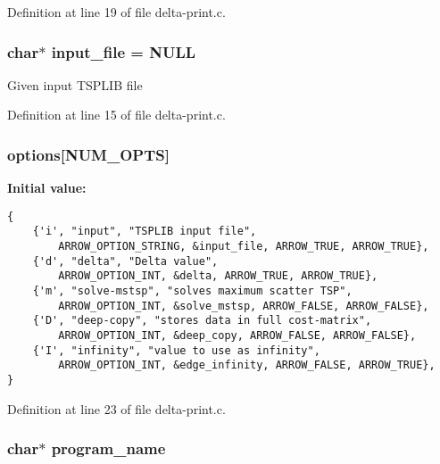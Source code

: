 Definition at line 19 of file delta-print.c.\hypertarget{delta-print_8c_a4f3a15de34c409bdec6ceacf93078ed}{
\subsubsection[{input\_\-file}]{\setlength{\rightskip}{0pt plus 5cm}char$\ast$ {\bf input\_\-file} = NULL}}
\label{delta-print_8c_a4f3a15de34c409bdec6ceacf93078ed}


Given input TSPLIB file 

Definition at line 15 of file delta-print.c.\hypertarget{delta-print_8c_cea6a9709d519c143f30db401a0d0c72}{
\subsubsection[{options}]{ {\bf options}\mbox{[}NUM\_\-OPTS\mbox{]}}}
\label{delta-print_8c_cea6a9709d519c143f30db401a0d0c72}


\textbf{Initial value:}

\begin{Code}\begin{verbatim} 
{
    {'i', "input", "TSPLIB input file", 
        ARROW_OPTION_STRING, &input_file, ARROW_TRUE, ARROW_TRUE},
    {'d', "delta", "Delta value", 
        ARROW_OPTION_INT, &delta, ARROW_TRUE, ARROW_TRUE},
    {'m', "solve-mstsp", "solves maximum scatter TSP",
        ARROW_OPTION_INT, &solve_mstsp, ARROW_FALSE, ARROW_FALSE},
    {'D', "deep-copy", "stores data in full cost-matrix",
        ARROW_OPTION_INT, &deep_copy, ARROW_FALSE, ARROW_FALSE},
    {'I', "infinity", "value to use as infinity",
        ARROW_OPTION_INT, &edge_infinity, ARROW_FALSE, ARROW_TRUE},        
}
\end{verbatim}
\end{Code}


Definition at line 23 of file delta-print.c.\hypertarget{delta-print_8c_289c5900d90626d909f0a85d5a0ed61d}{
\subsubsection[{program\_\-name}]{\setlength{\rightskip}{0pt plus 5cm}char$\ast$ {\bf program\_\-name}}}
\label{delta-print_8c_289c5900d90626d909f0a85d5a0ed61d}


